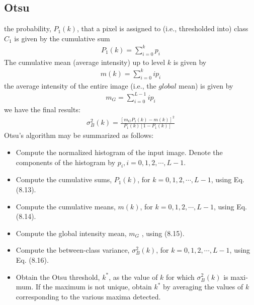 \documentclass[11pt,oneside]{book}
\begin{document}
\subsection{Otsu}
the probability, $P_1 (k)$, that a pixel is assigned to (i.e., thresholded into) class $C_1$ is given by the cumulative sum
\begin{align}
P_1(k)=\sum_{i=0}^{k}p_i
\end{align}
The cumulative mean (average intensity) up to level $k$ is given by
\begin{align}
m(k)=\sum_{i=0}^{k}ip_i
\end{align}
the average intensity of the entire image (i.e., the $global$ mean) is given by
\begin{align}
m_G=\sum_{i=0}^{L-1}ip_i
\end{align}
we have the final results:
\begin{align}
\sigma _B ^2(k)=\frac{[m_GP_1(k)-m(k)]^2}{P_1(k)[1-P_1(k)]}
\end{align}
Otsu’s algorithm may be summarized as follows:
\begin{itemize}
  \item Compute the normalized histogram of the input image. Denote the components of the histogram by $p_i , i = 0, 1, 2,\cdots , L - 1$.
  \item Compute the cumulative sums, $P_1 (k)$, for $k = 0, 1, 2,\cdots, L - 1$, using Eq. (8.13).
  \item Compute the cumulative means, $m(k)$, for $k = 0, 1, 2, \cdots, L - 1$, using Eq. (8.14).
  \item Compute the global intensity mean, $m_G$ , using (8.15).
  \item Compute the between-class variance, $\sigma _B^2(k)$, for $k = 0, 1, 2, \cdots , L - 1$, using Eq. (8.16).
  \item Obtain the Otsu threshold, $k^*$, as the value of $k$ for which $\sigma _B^2(k)$ is maxi-mum. If the maximum is not unique, obtain $k^*$ by averaging the values of $k$ corresponding to the various maxima detected.
\end{itemize}
\end{document}
